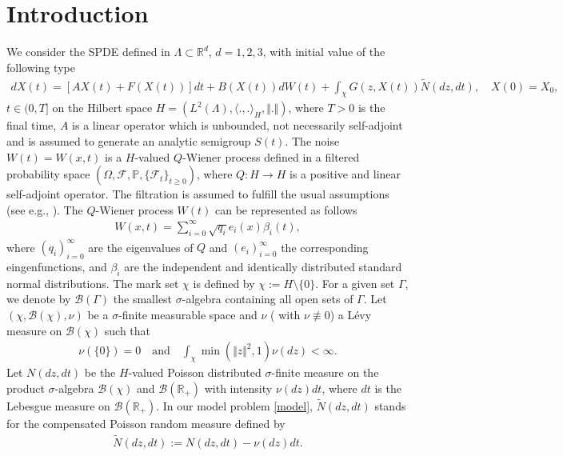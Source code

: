 \documentclass[review,12pt]{elsarticle}
\begin{document}
\section{Introduction}
\label{intro}
We consider the SPDE defined in $\Lambda\subset \mathbb{R}^d$, $d=1,2,3$,  with initial value  of the following type
\begin{eqnarray}
\label{model}
dX(t)=[AX(t)+F(X(t))]dt+B(X(t))dW(t)+\int_{\chi}G(z, X(t))\widetilde{N}(dz,dt), \quad X(0)=X_0, 
\end{eqnarray}
 $  t\in(0,T]$ on the Hilbert space $H=\left(L^2(\Lambda), \langle.,.\rangle_H, \Vert.\Vert\right)$, where  $T>0$ is the final time,   
$A$ is a linear operator which is unbounded,  not necessarily self-adjoint and is assumed to generate an analytic  semigroup $S(t)$.
The noise  $W(t)=W(x,t)$ is a $H$-valued $Q$-Wiener process defined in a filtered probability space $(\Omega,\mathcal{F}, \mathbb{P}, \{\mathcal{F}_t\}_{t\geq 0})$, where $Q : H\longrightarrow H$ is a positive and linear self-adjoint operator. The filtration is assumed to fulfill the usual assumptions (see e.g., \cite[Definition 2.1.11]{Prevot}). The $Q$-Wiener process $W(t)$ can be represented as follows \cite{Prevot, Prato}
\begin{eqnarray}
W(x, t)=\sum_{i=0}^{\infty}\sqrt{q_i}e_i(x)\beta_i(t),
\end{eqnarray}
where $(q_i)_{i=0}^{\infty}$ are the eigenvalues of $Q$ and $(e_i)_{i=0}^{\infty}$ the corresponding eingenfunctions, and $\beta_i$ are the independent and identically distributed standard normal distributions. 
The mark set $\chi$ is defined by $\chi:=H\setminus\{0\}$.  For a given  set  $\Gamma$,  we denote by $\mathcal{B}(\Gamma)$ the smallest $\sigma$-algebra containing all open sets of $\Gamma$. Let  $(\chi, \mathcal{B}(\chi), \nu)$ be a $\sigma$-finite measurable space and $\nu$ ( with $\nu\not\equiv 0$) a L\'{e}vy measure on $\mathcal{B}(\chi)$ such that
\begin{eqnarray}
\nu(\{0\})=0\quad \text{and}\quad \int_{\chi}\min(\Vert z\Vert^2, 1)\nu(dz)<\infty.
\end{eqnarray}
 Let $N(dz, dt)$ be the $H$-valued  Poisson  distributed $\sigma$-finite measure on the product $\sigma$-algebra $\mathcal{B}(\chi)$ and $\mathcal{B}(\mathbb{R}_{+})$ with intensity $\nu(dz)dt$, where $dt$ is the Lebesgue measure on $\mathcal{B}(\mathbb{R}_{+})$. In our model problem \eqref{model}, $\widetilde{N}(dz, dt)$ stands for the compensated Poisson random measure defined by
 \begin{eqnarray}
 \widetilde{N}(dz, dt):=N(dz, dt)-\nu(dz)dt.
 \end{eqnarray}
\end{document}
